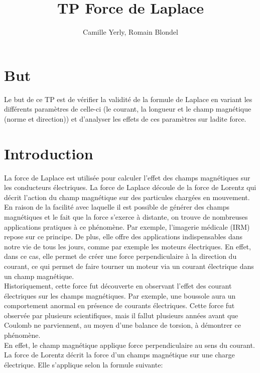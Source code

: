 \documentclass[11pt]{article}
\title{\textbf{TP Force de Laplace}}
\author{Camille Yerly, Romain Blondel}
\affil{2M8, Gymnase Auguste Piccard}
\begin{document}
    \maketitle

    \section{But}\label{sec:but}

    Le but de ce TP est de vérifier la validité de la formule de Laplace en variant les différents paramètres
    de celle-ci (le courant, la longueur et le champ magnétique (norme et direction)) et d'analyser les
    effets de ces paramètres sur ladite force.

    \section{Introduction}\label{sec:introduction}
    La force de Laplace est utilisée pour calculer l'effet des champs magnétiques sur les conducteurs
    électriques.
    La force de Laplace découle de la force de Lorentz qui décrit l'action du champ magnétique sur des
    particules chargées en mouvement.
    En raison de la facilité avec laquelle il est possible de générer des champs magnétiques et le fait que
    la force s'exerce à distante, on trouve de nombreuses applications pratiques à ce phénomène.
    Par exemple, l'imagerie médicale (IRM) repose sur ce principe.
    De plus, elle offre des applications indispensables dans notre vie de tous les jours, comme par
    exemple les moteurs électriques.
    En effet, dans ce cas, elle permet de créer une force perpendiculaire à la direction du courant, ce qui permet de
    faire tourner un moteur via un courant électrique dans un champ magnétique.\\
    Historiquement, cette force fut découverte en observant l'effet des courant électriques sur les champs
    magnétiques.
    Par exemple, une boussole aura un comportement anormal en présence de courants électriques.
    Cette force fut observée par plusieurs scientifiques, mais il fallut plusieurs années avant que Coulomb
    ne parviennent, au moyen d'une balance de torsion, à démontrer ce phénomène.\\
    En effet, le champ magnétique applique force perpendiculaire au sens du courant.
    La force de Lorentz décrit la force d'un champs magnétique sur une charge électrique.
    Elle s'applique selon la formule suivante:
\end{document}
